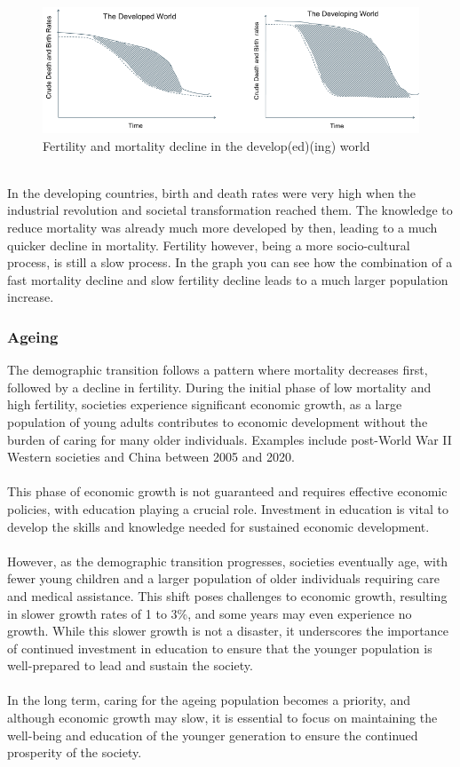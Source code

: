 \documentclass[../summary.tex]{subfiles}
\begin{document}
\begin{figure}[H]
	\centering
	\includegraphics[width=0.8\linewidth]{../images/Fertility_and_mortality_decline_in_developed_vs_developing_countries}
	\caption{Fertility and mortality decline in the develop(ed)(ing) world}
	\label{fig:fertilityandmortalitydeclineindevelopedvsdevelopingcountries}
\end{figure}
\ \\
In the developing countries, birth and death rates were very high when the industrial revolution and societal transformation reached them. The knowledge to reduce mortality was already much more developed by then, leading to a much quicker decline in mortality. Fertility however, being a more socio-cultural process, is still a slow process. In the graph you can see how the combination of a fast mortality decline and slow fertility decline leads to a much larger population increase.

\subsubsection{Ageing}

The demographic transition follows a pattern where mortality decreases first, followed by a decline in fertility. During the initial phase of low mortality and high fertility, societies experience significant economic growth, as a large population of young adults contributes to economic development without the burden of caring for many older individuals. Examples include post-World War II Western societies and China between 2005 and 2020.\\
\\
This phase of economic growth is not guaranteed and requires effective economic policies, with education playing a crucial role. Investment in education is vital to develop the skills and knowledge needed for sustained economic development.\\
\\
However, as the demographic transition progresses, societies eventually age, with fewer young children and a larger population of older individuals requiring care and medical assistance. This shift poses challenges to economic growth, resulting in slower growth rates of 1 to 3\%, and some years may even experience no growth. While this slower growth is not a disaster, it underscores the importance of continued investment in education to ensure that the younger population is well-prepared to lead and sustain the society.\\
\\
In the long term, caring for the ageing population becomes a priority, and although economic growth may slow, it is essential to focus on maintaining the well-being and education of the younger generation to ensure the continued prosperity of the society.
\end{document}
